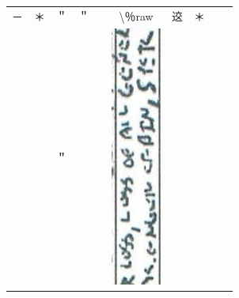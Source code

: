 \documentclass[10pt]{article}
\begin{document}
\begin{center}
\begin{tabular}{|c|c|c|c|c|c|c|c|c|c|}
 &  &  &  \\
\hline
－ & ＊ & ＂ & ＂ &  & \textbackslash ％raw & 䢒 & ＊ &  &  \\
\hline
 &  & ＂ &  &  & \includegraphics[max width=\textwidth]{2025_02_27_dd68c3d38de88f0516d9g-096(8)}

\end{tabular}
\end{center}
\end{document}
